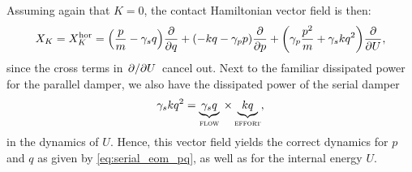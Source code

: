 Assuming again that \(K = 0\), the contact Hamiltonian vector field is then:
\begin{equation}
     X_K = X_K^\text{hor} = \qty(\frac{p}{m} - \gamma_s q)\pdv{}{q} + \qty(-kq -\gamma_p p)\pdv{}{p} + \qty(\gamma_p\frac{p^2}{m} + \gamma_s kq^2 )\pdv{}{U},
\end{equation}
since the cross terms in \(\pdv*{}{U}\) cancel out. Next to the familiar dissipated power for the parallel damper, we also have the dissipated power of the serial damper
\begin{equation}
     \gamma_s kq^2 = \underbrace{\gamma_s q}_\text{\textsc{flow}} \: \times \underbrace{kq}_\text{\textsc{effort}},
\end{equation} 
in the dynamics of \(U\). Hence, this vector field yields the correct dynamics for \(p\) and \(q\) as given by \cref{eq:serial_eom_pq}, as well as for the internal energy \(U\).

